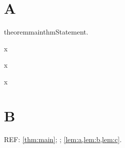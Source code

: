 \documentclass{article}
\begin{document}
\section{A}
\begin{restatable}{theorem}{mainthm}\label{thm:main}Statement.\end{restatable}
\begin{lemma}\label{lem:a}x\end{lemma}\begin{lemma}\label{lem:b}x\end{lemma}\begin{lemma}\label{lem:c}x\end{lemma}
\section{B}
\mainthm*
REF: \cref{thm:main}; ; \cref{lem:a,lem:b,lem:c}.
\end{document}
